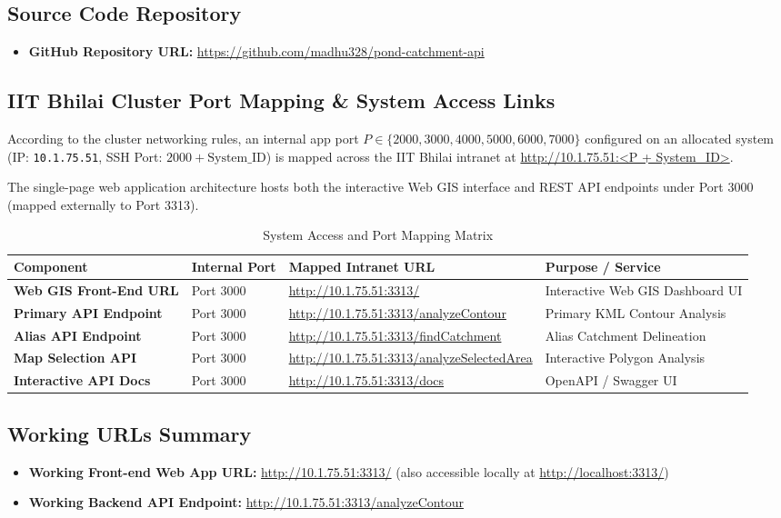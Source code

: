 \documentclass[11pt,a4paper]{article}
\begin{document}
\subsection{Source Code Repository}
\begin{itemize}
    \item \textbf{GitHub Repository URL:} \url{https://github.com/madhu328/pond-catchment-api}
\end{itemize}

\subsection{IIT Bhilai Cluster Port Mapping \& System Access Links}
According to the cluster networking rules, an internal app port $P \in \{2000, 3000, 4000, 5000, 6000, 7000\}$ configured on an allocated system (IP: \texttt{10.1.75.51}, SSH Port: $2000 + \text{System\_ID}$) is mapped across the IIT Bhilai intranet at \url{http://10.1.75.51:<P + System_ID>}.

The single-page web application architecture hosts both the interactive Web GIS interface and REST API endpoints under Port 3000 (mapped externally to Port 3313).

\begin{table}[h]
\centering
\caption{System Access and Port Mapping Matrix}
\label{tab:system_urls}
\vspace{0.2cm}
\begin{tabular}{llll}
\toprule
\textbf{Component} & \textbf{Internal Port} & \textbf{Mapped Intranet URL} & \textbf{Purpose / Service} \\
\midrule
\textbf{Web GIS Front-End URL} & Port 3000 & \url{http://10.1.75.51:3313/} & Interactive Web GIS Dashboard UI \\
\textbf{Primary API Endpoint} & Port 3000 & \url{http://10.1.75.51:3313/analyzeContour} & Primary KML Contour Analysis \\
\textbf{Alias API Endpoint} & Port 3000 & \url{http://10.1.75.51:3313/findCatchment} & Alias Catchment Delineation \\
\textbf{Map Selection API} & Port 3000 & \url{http://10.1.75.51:3313/analyzeSelectedArea} & Interactive Polygon Analysis \\
\textbf{Interactive API Docs} & Port 3000 & \url{http://10.1.75.51:3313/docs} & OpenAPI / Swagger UI \\
\bottomrule
\end{tabular}
\end{table}

\subsection{Working URLs Summary}
\begin{itemize}
    \item \textbf{Working Front-end Web App URL:} \url{http://10.1.75.51:3313/} (also accessible locally at \url{http://localhost:3313/})
    \item \textbf{Working Backend API Endpoint:} \url{http://10.1.75.51:3313/analyzeContour}
\end{itemize}
\end{document}
